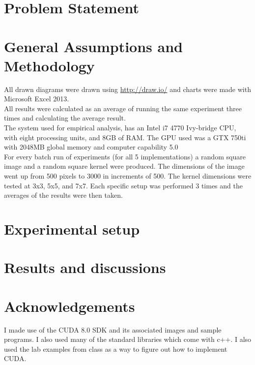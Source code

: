 \documentclass[11pt]{article}
\begin{document}
\begin{page}
\clearpage
\setcounter{page}{1}

\section{Problem Statement}

\section{General Assumptions and Methodology}
All drawn diagrams were drawn using \url{http://draw.io/} and charts were made with Microsoft Excel 2013.\\ All results were calculated as an average of running the same experiment three times and calculating the average result.\\

\noindent The system used for empirical analysis, has an Intel i7 4770 Ivy-bridge CPU, with eight processing units, and 8GB of RAM. The GPU used was a GTX 750ti with 2048MB global memory and computer capability 5.0\\

\noindent For every batch run of experiments (for all 5 implementations) a random square image and a random square kernel were produced. The dimensions of the image went up from 500 pixels to 3000 in increments of 500. The kernel dimensions were tested at 3x3, 5x5, and 7x7. Each specific setup was performed 3 times and the averages of the results were then taken.


\section{Experimental setup}

\section{Results and discussions}


\section*{Acknowledgements}
I made use of the CUDA 8.0 SDK and its associated images and sample programs. I also used many of the standard libraries which come with c++. I also used the lab examples from class as a way to figure out how to implement CUDA.


{}
\end{page}
\end{document}
